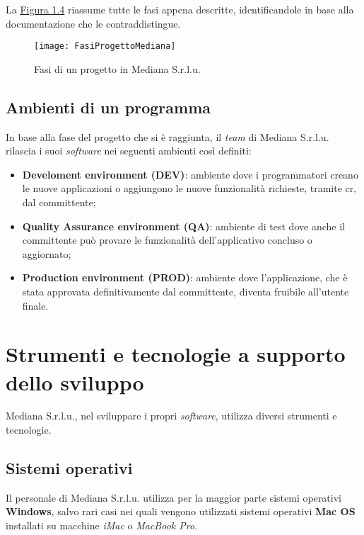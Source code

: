 La \hyperref[fasiProgetto]{Figura 1.4} riassume tutte le fasi appena descritte, identificandole in base alla documentazione che le contraddistingue.

\begin{figure}[ht]
\begin{center}
\texttt{[image: FasiProgettoMediana]}
\caption{Fasi di un progetto in Mediana S.r.l.u.}
\label{fasiProgetto}
\end{center}
\end{figure}
\FloatBarrier

\subsection{Ambienti di un programma}
\label{ambienti programma}
In base alla fase del progetto che si è raggiunta, il \textit{team} di Mediana S.r.l.u. rilascia i suoi \textit{software} nei seguenti ambienti così definiti:
\begin{itemize}
\item \textbf{Develoment environment (DEV)}: ambiente dove i programmatori creano le nuove applicazioni o aggiungono le nuove funzionalità richieste, tramite \acrshort{cr}, dal committente;
\item \textbf{Quality Assurance environment (QA)}: ambiente di test dove anche il committente può provare le funzionalità dell'applicativo concluso o aggiornato;
\item \textbf{Production environment (PROD)}: ambiente dove l'applicazione, che è stata approvata definitivamente dal committente, diventa fruibile all'utente finale.
\end{itemize}

\section{Strumenti e tecnologie a supporto dello sviluppo}
\label{strumenti e tecnologie}
Mediana S.r.l.u., nel sviluppare i propri \textit{software}, utilizza diversi strumenti e tecnologie.

\subsection{Sistemi operativi}
\label{sistemi operativi}
Il personale di Mediana S.r.l.u. utilizza per la maggior parte sistemi operativi \textbf{Windows}, salvo rari casi nei quali vengono utilizzati sistemi operativi \textbf{Mac OS} installati su macchine \textit{iMac} o \textit{MacBook Pro}.

